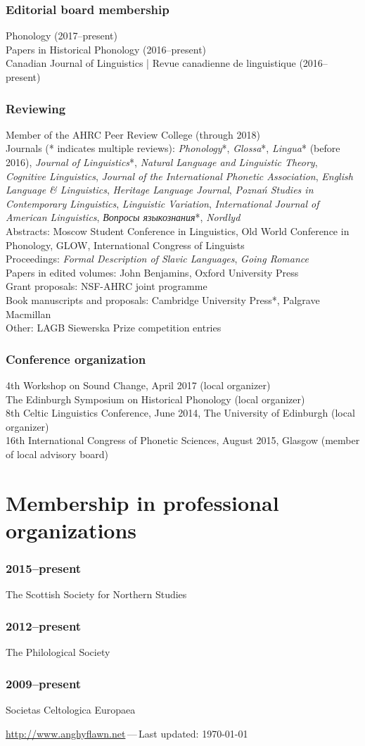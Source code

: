 \documentclass[a4paper,11pt]{article}
\newlength\blockwidth
\newcommand\textitrussian[1]{\textrussian{\textit{#1}}}
\newcommand\cvitem[1]{\hspace*{\blockwidth}\begin{minipage}[t]{\linewidth-\blockwidth}
#1
\end{minipage}\par}
\newcommand{\block}[2]{\subsubsection{#1}\cvitem{#2}}
\begin{document}
\block{Editorial board membership}{Phonology (2017--present)\\
  Papers in Historical Phonology (2016--present)\\
  Canadian Journal of Linguistics | Revue canadienne de linguistique (2016--present)}
\block{Reviewing}{Member of the AHRC Peer Review College (through 2018)\\Journals (* indicates multiple reviews): \emph{Phonology}*, \emph{Glossa}*, \emph{Lingua}* (before 2016), \emph{Journal of Linguistics}*, \emph{Natural Language and Linguistic Theory}, \emph{Cognitive Linguistics}, \emph{Journal of the International Phonetic Association}, \emph{English Language \&{} Linguistics}, \emph{Heritage Language Journal}, \emph{Poznań Studies in Contemporary Linguistics}, \emph{Linguistic Variation}, \emph{International Journal of American Linguistics}, \textitrussian{Вопросы языкознания}*, \emph{Nordlyd}\\
Abstracts: Moscow Student Conference in Linguistics, Old World Conference in Phonology, GLOW, International Congress of Linguists\\
Proceedings: \emph{Formal Description of Slavic Languages}, \emph{Going Romance}\\
Papers in edited volumes: John Benjamins, Oxford University Press\\
Grant proposals: NSF-AHRC joint programme\\
Book manuscripts and proposals: Cambridge University Press*, Palgrave Macmillan\\
Other: LAGB Siewerska Prize competition entries}
\block{Conference organization}{4th Workshop on Sound Change, April 2017 (local organizer)\\
  The Edinburgh Symposium on Historical Phonology (local organizer)\\
8th Celtic Linguistics Conference, June 2014, The University of Edinburgh (local organizer)\\
16th International Congress of Phonetic Sciences, August 2015, Glasgow (member of local advisory board)}

\section{Membership in professional organizations}
\block{2015--present}{The Scottish Society for Northern Studies}
\block{2012--present}{The Philological Society}
\block{2009--present}{Societas Celtologica Europaea}

\vfill{}
\hrulefill

\begin{center}
{\footnotesize \href{http://www.anghyflawn.net}{http://www.anghyflawn.net}{\,---\,}Last  updated: \today
}
\end{center}
\end{document}
